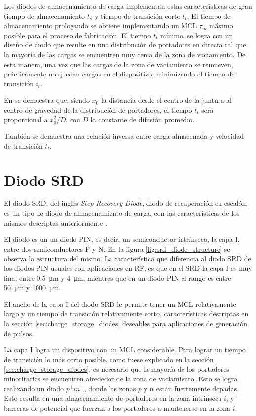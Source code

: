 Los diodos de almacenamiento de carga implementan estas características de gran
tiempo de almacenamiento $t_s$ y tiempo de transición corto $t_t$. El tiempo de
almacenamiento prologando se obtiene implementando un MCL $\tau_m$ máximo
posible para el proceso de fabricación. El tiempo $t_t$ mínimo, se logra con un
diseño de diodo que resulte en una distribución de portadores en directa tal que
la mayoría de las cargas se encuentren muy cerca de la zona de vaciamiento. De
esta manera, una vez que las cargas de la zona de vaciamiento se remueven,
prácticamente no quedan cargas en el dispositivo, minimizando el tiempo de
transición $t_t$.

En \cite{moll1962} se demuestra que, siendo $x_0$ la distancia desde el centro
de la juntura al centro de gravedad de la distribución de portadores, el tiempo
$t_t$ será proporcional a $x_0^2/D$, con $D$ la constante de difusión promedio.

También se demuestra una relación inversa entre carga almacenada y velocidad de
transición $t_t$.

\section{Diodo SRD}
\label{sec:srd_diode}

El diodo SRD, del inglés \textit{Step Recovery Diode}, diodo de recuperación en
escalón, es un tipo de diodo de almacenamiento de carga, con las características
de los mismos descriptas anteriormente \cite{moll1969}.

El diodo es un un diodo PIN, es decir, un semiconductor intrínseco, la capa I,
entre dos semiconductores P y N. En la figura \ref{fig:srd_diode_structure} se
observa la estructura del mismo. La característica que diferencia al diodo SRD
de los diodos PIN usuales con aplicaciones en RF, es que en el SRD la capa I es
muy fina, entre \qty{0.5}{\micro\meter} y \qty{4}{\micro\meter}, mientras que en
un diodo PIN el rango es entre \qty{50}{\micro\meter} y
\qty{1000}{\micro\meter}.

El ancho de la capa I del diodo SRD le permite tener un MCL relativamente largo
y un tiempo de transición relativamente corto, características descriptas en
la sección \ref{sec:charge_storage_diodes} deseables para aplicaciones de generación de pulsos.

La capa I logra un dispositivo con un MCL considerable. Para lograr un tiempo de
transición lo más corto posible, como fuese explicado en la sección
\ref{sec:charge_storage_diodes}, es necesario que la mayoría de los portadores
minoritarios se encuentren alrededor de la zona de vaciamiento. Esto se logra
realizando un diodo $p^+in^+$, donde las zonas $p$ y $n$ están fuertemente
dopadas. Esto resulta en una almacenamiento de portadores en la zona intrinseca
$i$, y barreras de potencial que fuerzan a los portadores a mantenerse en la
zona $i$.

